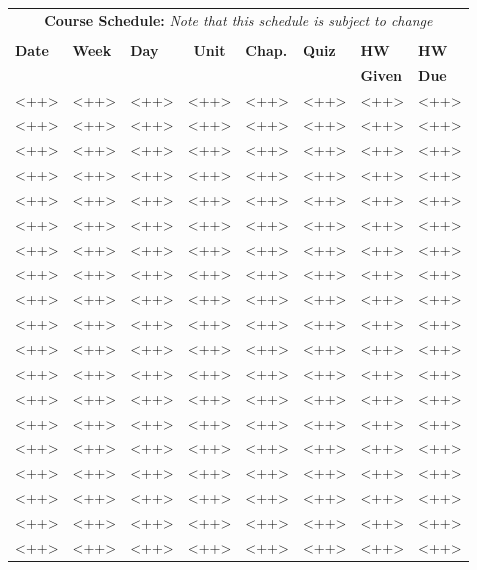 \documentclass[11pt]{article}
\begin{document}
\pagebreak
\FloatBarrier
\renewcommand{\arraystretch}{1}
\begin{table}[h]
\begin{center}
\begin{tabular}{lllcllll}
\multicolumn{8}{c}{\textbf{Course Schedule:}\textit{ Note that this schedule is subject to change}}\\
&&&&&&&\\
\textbf{Date} & \textbf{Week} & \textbf{Day} & \textbf{Unit} & \textbf{Chap.} & \textbf{Quiz} & \textbf{HW} & \textbf{HW}\\
 &  &  &  &  &                                                                                          & \textbf{Given} & \textbf{Due}\\
\hline
\hline
<++> & <++> & <++> & <++> & <++> & <++> & <++> & <++>\\
<++> & <++> & <++> & <++> & <++> & <++> & <++> & <++>\\
<++> & <++> & <++> & <++> & <++> & <++> & <++> & <++>\\
<++> & <++> & <++> & <++> & <++> & <++> & <++> & <++>\\
<++> & <++> & <++> & <++> & <++> & <++> & <++> & <++>\\
<++> & <++> & <++> & <++> & <++> & <++> & <++> & <++>\\
<++> & <++> & <++> & <++> & <++> & <++> & <++> & <++>\\
<++> & <++> & <++> & <++> & <++> & <++> & <++> & <++>\\
<++> & <++> & <++> & <++> & <++> & <++> & <++> & <++>\\
<++> & <++> & <++> & <++> & <++> & <++> & <++> & <++>\\
<++> & <++> & <++> & <++> & <++> & <++> & <++> & <++>\\
<++> & <++> & <++> & <++> & <++> & <++> & <++> & <++>\\
<++> & <++> & <++> & <++> & <++> & <++> & <++> & <++>\\
<++> & <++> & <++> & <++> & <++> & <++> & <++> & <++>\\
<++> & <++> & <++> & <++> & <++> & <++> & <++> & <++>\\
<++> & <++> & <++> & <++> & <++> & <++> & <++> & <++>\\
<++> & <++> & <++> & <++> & <++> & <++> & <++> & <++>\\
<++> & <++> & <++> & <++> & <++> & <++> & <++> & <++>\\
<++> & <++> & <++> & <++> & <++> & <++> & <++> & <++>\\

\end{tabular}
\end{center}
\end{table}
\end{document}
